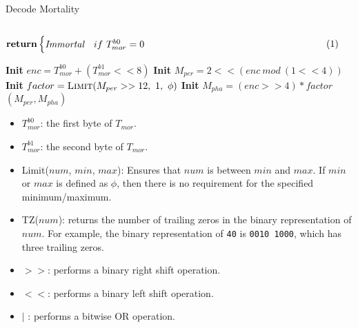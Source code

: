 \begin{definition}
    \begin{algorithm}[H]
        \caption[]{\sc Decode Mortality}
        \label{algo-decode-mortality}
        \begin{algorithmic}[1]
            \State $\vcenter{
                \begin{flalign*}
                    \Return & 
                    \begin{cases}
                    \textit{Immortal} & if\ T^{b0}_{mor} = 0
                    \end{cases}&
                \end{flalign*}
            }$
            \Statex 
            \State \textbf{Init} $enc = T^{b0}_{mor} + (T^{b1}_{mor} << 8)$
            \State \textbf{Init} $M_{per} = 2 << (enc\ mod\ (1 << 4))$
            \State \textbf{Init} $factor = \textsc{Limit}(M_{per} >> 12,\ 1,\ \phi)$
            \State \textbf{Init} $M_{pha} = (enc >> 4) * factor$
            \State \Return $(M_{per}, M_{pha})$
        \end{algorithmic}
    \end{algorithm}

    \begin{itemize}
        \item $T^{b0}_{mor}$: the first byte of $T_{mor}$.
        \item $T^{b1}_{mor}$: the second byte of $T_{mor}$.
        \item {\sc Limit($num$, $min$, $max$)}: Ensures that $num$ is between
        $min$ and $max$. If $min$ or $max$ is defined as $\phi$, then there is
        no requirement for the specified minimum/maximum.
        \item {\sc TZ($num$)}: returns the number of trailing zeros in the
        binary representation of $num$. For example, the binary
        representation of \verb|40| is \verb|0010 1000|, which has three
        trailing zeros.
        \item $>>$: performs a binary right shift operation.
        \item $<<$: performs a binary left shift operation.
        \item $|$ : performs a bitwise OR operation.
    \end{itemize}
\end{definition}

